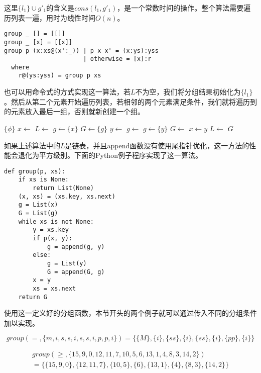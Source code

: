 \documentclass[b5paper]{ctexart}
\begin{document}
这里$\{l_1\} \cup g'_1$的含义是$cons(l_1, g'_1)$，是一个常数时间的操作。整个算法需要遍历列表一遍，用时为线性时间$O(n)$。

\lstset{language=Haskell}
\begin{lstlisting}[style=Haskell]
group _ [] = [[]]
group _ [x] = [[x]]
group p (x:xs@(x':_)) | p x x' = (x:ys):yss
                      | otherwise = [x]:r
  where
    r@(ys:yss) = group p xs
\end{lstlisting}

也可以用命令式的方式实现这一算法，若$L$不为空，我们将分组结果初始化为$\{{l_1\}}$。然后从第二个元素开始遍历列表，若相邻的两个元素满足条件，我们就将遍历到的元素放入最后一组，否则就新创建一个组。

\begin{algorithmic}[1]
    \State \Return $\{ \phi \}$
  \EndIf
  \State $x \gets$ 
  \State $L \gets$ 
  \State $g \gets \{ x \}$
  \State $G \gets \{ g \}$
    \State $y \gets$ 
      \State $g \gets $ 
    \Else
      \State $g \gets \{y\}$
      \State $G \gets$ 
    \EndIf
    \State $x \gets y$
    \State $L \gets$ 
  \EndWhile
  \State \Return $G$
\EndFunction
\end{algorithmic}

如果上述算法中的$L$是链表，并且append函数没有使用尾指针优化，这一方法的性能会退化为平方级别。下面的Python例子程序实现了这一算法。

\lstset{language=Python}
\begin{lstlisting}
def group(p, xs):
    if xs is None:
        return List(None)
    (x, xs) = (xs.key, xs.next)
    g = List(x)
    G = List(g)
    while xs is not None:
        y = xs.key
        if p(x, y):
            g = append(g, y)
        else:
            g = List(y)
            G = append(G, g)
        x = y
        xs = xs.next
    return G
\end{lstlisting}

使用这一定义好的分组函数，本节开头的两个例子就可以通过传入不同的分组条件加以实现。

\[
group(=, \{m,i,s,s,i,s,s,i,p,p,i\}) = \{ \{M\}, \{i\}, \{ss\}, \{i\}, \{ss\}, \{i\}, \{pp\}, \{i\} \}
\]

\[
\begin{array}{l}
group(\geq,  \{15, 9, 0, 12, 11, 7, 10, 5, 6, 13, 1, 4, 8, 3, 14, 2\}) \\
  = \{ \{15, 9, 0\}, \{12, 11, 7\}, \{10, 5\}, \{6\}, \{13, 1\}, \{4\}, \{8, 3\}, \{14, 2\}\}
\end{array}
\]
\end{document}
